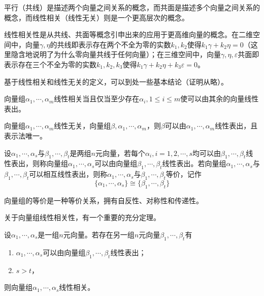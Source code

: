 \begin{remark}
    平行（共线）是描述两个向量之间关系的概念，而共面是描述多个向量之间关系的概念，而线性相关（线性无关）则是一个更高层次的概念。
\end{remark}

\begin{remark}
    线性相关性是从共线、共面等概念引申出来的应用于更高维向量的概念。在二维空间中，向量$\gamma,\eta$的共线即表示存在两个不全为零的实数$k_1,k_2$使得$k_1\gamma+k_2\eta=0$（这里隐含地说明了为什么零向量共线于任何向量）；在三维空间中，向量$\gamma,\eta,\varepsilon$共面即表示存在三个不全为零的实数$k_1,k_2,k_3$使得$k_1\gamma+k_2\eta+k_3\varepsilon=0$。
\end{remark}

基于线性相关和线性无关的定义，可以到处一些基本结论（证明从略）。

\begin{thm}
    \label{thm-iff-vector-group-dependence}
    向量组$\alpha_1,\cdots,\alpha_m$线性相关当且仅当至少存在$\alpha_i,1\leqslant i\leqslant m$使可以由其余的向量线性表出。
\end{thm}

\begin{thm}
    \label{thm-independence-vec-grp-append}
    向量组$\alpha_1,\cdots,\alpha_m$线性无关，向量组$\beta,\alpha_1,\cdots,\alpha_m$，则$\beta$可以由$\alpha_1,\cdots,\alpha_m$线性表出，且表示法唯一。
\end{thm}

\begin{definition}
    \label{def-linear-represent}
    设$\alpha_1,\cdots,\alpha_s$与$\beta_1,\cdots,\beta_t$是两组$n$元向量，若每个$\alpha_i,i=1,2,\cdots,s$均可以由$\beta_1,\cdots,\beta_t$线性表出，则称向量组$\alpha_1,\cdots,\alpha_s$可以由向量组$\beta_1,\cdots,\beta_t$线性表出。若向量组$\alpha_1,\cdots,\alpha_s$与$\beta_1,\cdots,\beta_t$可以相互线性表出，则称$\alpha_1,\cdots,\alpha_s$与$\beta_1,\cdots,\beta_t$等价，记作
    \[ \{\alpha_1,\cdots,\alpha_s\}\cong\{\beta_1,\cdots,\beta_t\} \]
\end{definition}

向量组的等价是一种等价关系，拥有自反性、对称性和传递性。

关于向量组线性相关性，有一个重要的充分定理。

\begin{thm}
    \label{thm-important-linear-dependence}
    设$\alpha_1,\cdots,\alpha_s$是一组$n$元向量。若存在另一组$n$元向量$\beta_1,\cdots,\beta_t$有
    \begin{enumerate}
        \item $\alpha_1,\cdots,\alpha_s$可以由向量组$\beta_1,\cdots,\beta_t$线性表出；
        \item $s>t$，
    \end{enumerate}
    则向量组$\alpha_1,\cdots,\alpha_s$线性相关。
\end{thm}

